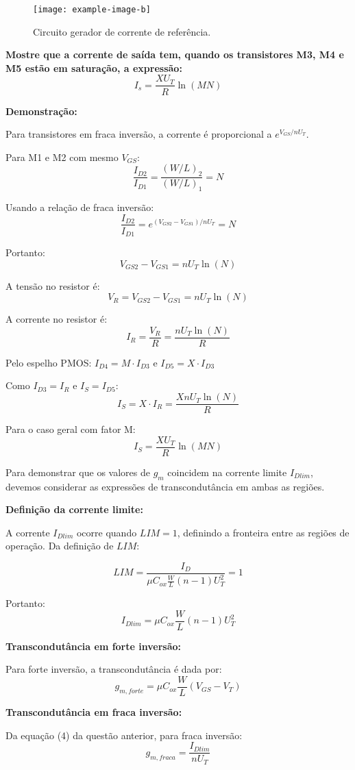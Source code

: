 ﻿\documentclass[12pt,a4paper]{article}
\begin{document}
\begin{figure}[H]
    \centering
    \texttt{[image: example-image-b]}
    \caption{Circuito gerador de corrente de referência.}
    \label{fig:gerador_corrente}
\end{figure}

\textbf{Mostre que a corrente de saída tem, quando os transistores M3, M4 e M5 estão em saturação, a expressão:}
$$I_s = \frac{XU_T}{R} \ln(MN)$$

\textbf{Demonstração:}

Para transistores em fraca inversão, a corrente é proporcional a $e^{V_{GS}/nU_T}$. 

Para M1 e M2 com mesmo $V_{GS}$:
$$\frac{I_{D2}}{I_{D1}} = \frac{(W/L)_2}{(W/L)_1} = N$$

Usando a relação de fraca inversão:
$$\frac{I_{D2}}{I_{D1}} = e^{(V_{GS2} - V_{GS1})/nU_T} = N$$

Portanto:
$$V_{GS2} - V_{GS1} = nU_T \ln(N)$$

A tensão no resistor é:
$$V_R = V_{GS2} - V_{GS1} = nU_T \ln(N)$$

A corrente no resistor é:
$$I_R = \frac{V_R}{R} = \frac{nU_T \ln(N)}{R}$$

Pelo espelho PMOS: $I_{D4} = M \cdot I_{D3}$ e $I_{D5} = X \cdot I_{D3}$

Como $I_{D3} = I_R$ e $I_S = I_{D5}$:
$$I_S = X \cdot I_R = \frac{XnU_T \ln(N)}{R}$$

Para o caso geral com fator M:
$$\boxed{I_S = \frac{XU_T}{R} \ln(MN)}$$

Para demonstrar que os valores de $g_m$ coincidem na corrente limite $I_{Dlim}$, devemos considerar as expressões de transcondutância em ambas as regiões.

\textbf{Definição da corrente limite:}

A corrente $I_{Dlim}$ ocorre quando $LIM = 1$, definindo a fronteira entre as regiões de operação. Da definição de $LIM$:

$$LIM = \frac{I_D}{\mu C_{ox} \frac{W}{L} (n-1) U_T^2} = 1$$

Portanto:
$$I_{Dlim} = \mu C_{ox} \frac{W}{L} (n-1) U_T^2 $$

\textbf{Transcondutância em forte inversão:}

Para forte inversão, a transcondutância é dada por:
$$g_{m,forte} = \mu C_{ox} \frac{W}{L} (V_{GS} - V_T) $$

\textbf{Transcondutância em fraca inversão:}

Da equação (4) da questão anterior, para fraca inversão:
$$g_{m,fraca} = \frac{I_{Dlim}}{nU_T} $$
\end{document}
